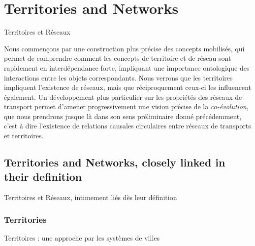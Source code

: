 


\newpage




\section{Territories and Networks}{Territoires et Réseaux}

\label{sec:networkterritories}




Nous commençons par une construction plus précise des concepts mobilisés, qui permet de comprendre comment les concepts de territoire et de réseau sont rapidement en interdépendance forte, impliquant une importance ontologique des interactions entre les objets correspondants. Nous verrons que les territoires impliquent l'existence de réseaux, mais que réciproquement ceux-ci les influencent également. Un développement plus particulier sur les propriétés des réseaux de transport permet d'amener progressivement une vision précise de la \emph{co-évolution}, que nous prendrons jusque là dans son sens préliminaire donné précédemment, c'est à dire l'existence de relations causales circulaires entre réseaux de transports et territoires.




\subsection{Territories and Networks, closely linked in their definition}{Territoires et Réseaux, intimement liés dès leur définition}



\subsubsection{Territories}{Territoires : une approche par les systèmes de villes}


